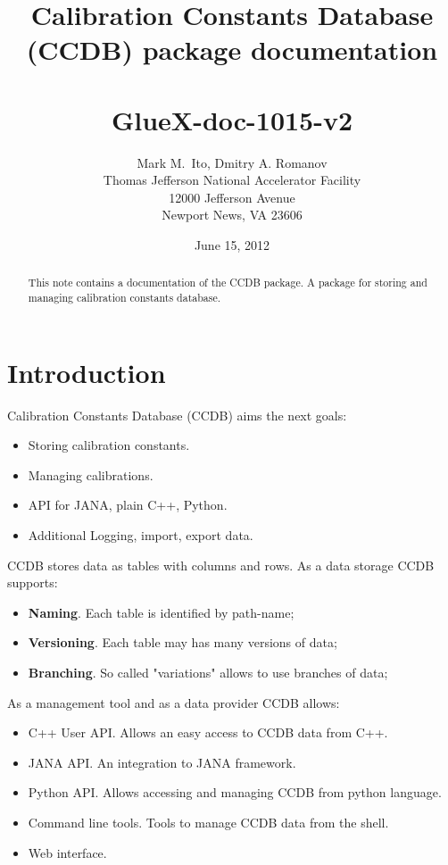 \documentclass{article}
\title{Calibration Constants Database (CCDB) package documentation \\
~\\
\large GlueX-doc-1015-v2
}
\author{Mark M.\ Ito, Dmitry A. Romanov \\
Thomas Jefferson National Accelerator Facility \\
12000 Jefferson Avenue \\
Newport News, VA 23606
}
\date{June 15, 2012}
\begin{document}


\maketitle

\begin{abstract}
This note contains a documentation of the CCDB package. A package for storing 
and managing calibration constants database.
\end{abstract}

\tableofcontents


\newpage
\section{Introduction}

%

Calibration Constants Database (CCDB) aims the next goals:
\begin{itemize}
  \item Storing calibration constants.
  \item Managing calibrations.
  \item API for JANA, plain C++, Python.
  \item Additional Logging, import, export data.
\end{itemize}
\vspace{1 em}

CCDB stores data as tables with columns and rows. As a data storage CCDB supports:
\begin{itemize}
\item \textbf{Naming}. Each table is identified by path-name;
\item \textbf{Versioning}. Each table may has many versions of data;
\item \textbf{Branching}. So called "variations" allows to use branches of data;
\end{itemize}
\vspace{1 em}

As a management tool and as a data provider CCDB allows:
\begin{itemize}
\item C++ User API. Allows an easy access to CCDB data from C++.
\item JANA API. An integration to JANA framework.
\item Python API. Allows accessing and managing CCDB from python language.
\item Command line tools. Tools to manage CCDB data from the shell.
\item Web interface.
\end{itemize}
\vspace{1 em}
\end{document}
